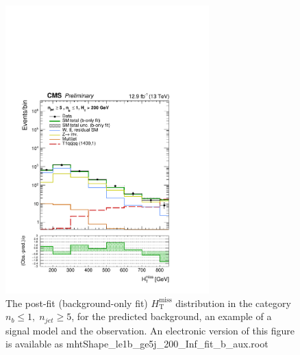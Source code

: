 \begin{figure}[tbhp]
    \caption{ 
    The post-fit (background-only fit) $H_{\mathrm{T}}^{\mathrm{miss}}$ distribution in the category $n_{b}\leq 1, \; n_{jet} \geq 5$, 
    for the predicted background, an example of a signal model and the observation.
    An electronic version of this figure is available as mhtShape\_le1b\_ge5j\_200\_Inf\_fit\_b\_aux.root
    \label{fig:mhtShape_le1b_ge5j_fit_b} }
  \begin{center}
  \includegraphics[width=0.7\textwidth]{mhtShape_le1b_ge5j_200_Inf_fit_b_aux}
  \end{center}
\end{figure}


